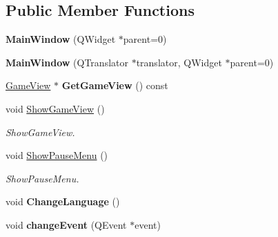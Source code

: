 \subsection*{Public Member Functions}
\begin{DoxyCompactItemize}
\item 
\hypertarget{classMainWindow_a8b244be8b7b7db1b08de2a2acb9409db}{{\bfseries Main\-Window} (Q\-Widget $\ast$parent=0)}\label{classMainWindow_a8b244be8b7b7db1b08de2a2acb9409db}

\item 
\hypertarget{classMainWindow_a7d24542d1fbdffd9537ceb421353c860}{{\bfseries Main\-Window} (Q\-Translator $\ast$translator, Q\-Widget $\ast$parent=0)}\label{classMainWindow_a7d24542d1fbdffd9537ceb421353c860}

\item 
\hypertarget{classMainWindow_aaedb921530e29c02b7746ae62ce62ddf}{\hyperlink{classGameView}{Game\-View} $\ast$ {\bfseries Get\-Game\-View} () const }\label{classMainWindow_aaedb921530e29c02b7746ae62ce62ddf}

\item 
\hypertarget{classMainWindow_a8c6fb0a68de0e1af14efba33f90d6eae}{void \hyperlink{classMainWindow_a8c6fb0a68de0e1af14efba33f90d6eae}{Show\-Game\-View} ()}\label{classMainWindow_a8c6fb0a68de0e1af14efba33f90d6eae}

\begin{DoxyCompactList}\small\item\em Show\-Game\-View. \end{DoxyCompactList}\item 
\hypertarget{classMainWindow_ad1f9c6b77e288f15777f03d53244a9c2}{void \hyperlink{classMainWindow_ad1f9c6b77e288f15777f03d53244a9c2}{Show\-Pause\-Menu} ()}\label{classMainWindow_ad1f9c6b77e288f15777f03d53244a9c2}

\begin{DoxyCompactList}\small\item\em Show\-Pause\-Menu. \end{DoxyCompactList}\item 
\hypertarget{classMainWindow_a9069444f88de1d1b55eadd1eb7a65f2a}{void {\bfseries Change\-Language} ()}\label{classMainWindow_a9069444f88de1d1b55eadd1eb7a65f2a}

\item 
\hypertarget{classMainWindow_ac7c881667b4ba4986b5a0030452ee3f0}{void {\bfseries change\-Event} (Q\-Event $\ast$event)}\label{classMainWindow_ac7c881667b4ba4986b5a0030452ee3f0}


\end{DoxyCompactItemize}
